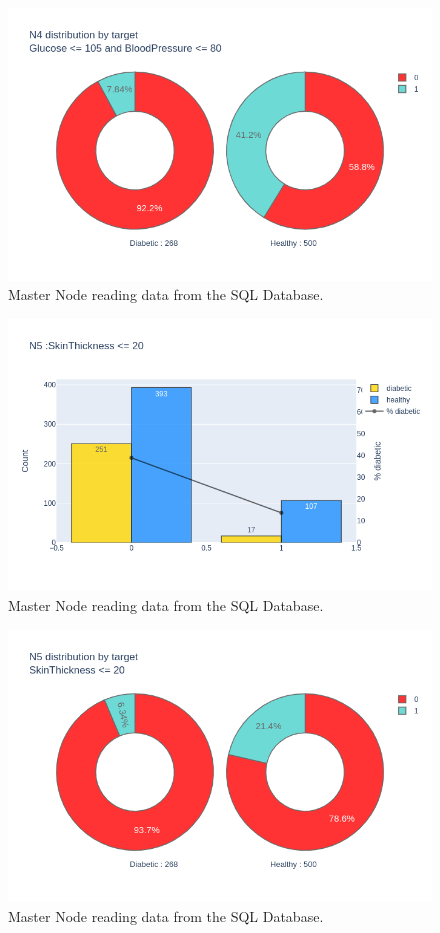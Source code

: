 \documentclass[12pt]{article}
\begin{document}
\begin{figure}[ht]
\centering
\includegraphics[width=1\textwidth]{newplot(22).png}
\caption{Master Node reading data from the SQL Database.}
\end{figure}

\begin{figure}[ht]
\centering
\includegraphics[width=1\textwidth]{newplot(23).png}
\caption{Master Node reading data from the SQL Database.}
\end{figure}

\begin{figure}[ht]
\centering
\includegraphics[width=1\textwidth]{newplot(24).png}
\caption{Master Node reading data from the SQL Database.}
\end{figure}
\end{document}
